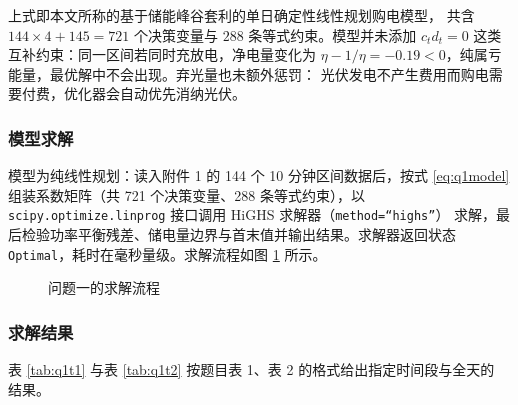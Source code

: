 \documentclass[withoutpreface]{cumcmthesis}
\begin{document}
上式即本文所称的基于储能峰谷套利的单日确定性线性规划购电模型，
共含 $144\times4+145=721$ 个决策变量与 $288$ 条等式约束。模型并未添加
$c_td_t=0$ 这类互补约束：同一区间若同时充放电，净电量变化为
$\eta-1/\eta=-0.19<0$，纯属亏能量，最优解中不会出现。弃光量也未额外惩罚：
光伏发电不产生费用而购电需要付费，优化器会自动优先消纳光伏。

\subsubsection{模型求解}

模型为纯线性规划：读入附件 1 的 144 个 10 分钟区间数据后，按式 \eqref{eq:q1model}
组装系数矩阵（共 721 个决策变量、288 条等式约束），以
\texttt{scipy.optimize.linprog} 接口调用 HiGHS 求解器（\texttt{method=“highs”}）
求解，最后检验功率平衡残差、储电量边界与首末值并输出结果。求解器返回状态
\texttt{Optimal}，耗时在毫秒量级。求解流程如图 \ref{fig:q1flow} 所示。

\begin{figure}[!htbp]
  \centering
  \caption{问题一的求解流程}
  \label{fig:q1flow}
\end{figure}

\subsubsection{求解结果}
\label{sec:q1result}

表 \ref{tab:q1t1} 与表 \ref{tab:q1t2} 按题目表 1、表 2 的格式给出指定时间段与全天的
结果。
\end{document}
